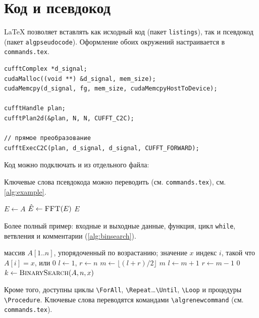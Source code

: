 
\section{Код и псевдокод}
\LaTeX{} позволяет вставлять как исходный код (пакет \texttt{listings}),
так и псевдокод (пакет \texttt{algpseudocode}). Оформление обоих окружений
настраивается в \texttt{commands.tex}.

\begin{lstlisting}[caption={Вызов БПФ в библиотеке \texttt{cuFFT}}, label={lst:cufft}]
cufftComplex *d_signal;
cudaMalloc((void **) &d_signal, mem_size);
cudaMemcpy(d_signal, fg, mem_size, cudaMemcpyHostToDevice);

cufftHandle plan;
cufftPlan2d(&plan, N, N, CUFFT_C2C);

// прямое преобразование
cufftExecC2C(plan, d_signal, d_signal, CUFFT_FORWARD);
\end{lstlisting}

Код можно подключать и из отдельного файла:
\begin{center}
    \verb++
\end{center}

Ключевые слова псевдокода можно переводить (см. \texttt{commands.tex}),
см. \autoref{alg:example}.
\begin{algorithm}[H]
    \caption{Пример псевдокода}\label{alg:example}
    \begin{algorithmic}[1]
            \State $E \gets A$
                \State $\hat{E} \gets \Call{FFT}{E}$
            \EndFor
            \State \Return $E$
        \EndProcedure
    \end{algorithmic}
\end{algorithm}

Более полный пример: входные и выходные данные, функция, цикл
\texttt{while}, ветвления и комментарии (\autoref{alg:binsearch}).
\begin{algorithm}[H]
    \caption{Бинарный поиск}\label{alg:binsearch}
    \begin{algorithmic}[1]
        \Require массив $A[1..n]$, упорядоченный по возрастанию; значение $x$
        \Ensure индекс $i$, такой что $A[i] = x$, или $0$
            \State $l \gets 1$, $r \gets n$
                \State $m \gets \lfloor (l + r) / 2 \rfloor$
                    \State \Return $m$
                    \State $l \gets m + 1$ 
                \Else
                    \State $r \gets m - 1$ 
                \EndIf
            \EndWhile
            \State \Return $0$
        \EndFunction
        \Statex
        \State $k \gets \Call{BinarySearch}{A, n, x}$
    \end{algorithmic}
\end{algorithm}

Кроме того, доступны циклы \verb+\ForAll+, \verb+\Repeat+\dots\verb+\Until+,
\verb+\Loop+ и процедуры \verb+\Procedure+. Ключевые слова переводятся
командами \verb+\algrenewcommand+ (см. \texttt{commands.tex}).
